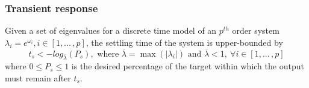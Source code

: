\documentclass[sigconf]{llncs}
\begin{document}
\subsubsection{Transient response} 
\label{sec:transientspecificationproof}
\begin{theorem}
Given a set of eigenvalues for a discrete time model of an $p^{th}$ order system $\lambda_i =e^{\omega_i}, i \in [1, ...\,,p]$, the settling time of the system is upper-bounded by
\begin{equation}
t_s<-log_{\overline{\lambda}}({P_s}), \text{ where }  \overline{\lambda} = \max(|\lambda_i|) \text{ and } \overline{\lambda}<1,\ \forall i \in [1, ...\,,p]
\label{eq:set_time}
\end{equation}
where $0\leq P_s \leq 1$ is the desired percentage of the target within which the output must remain after $t_s$.
\end{theorem}
\end{document}
